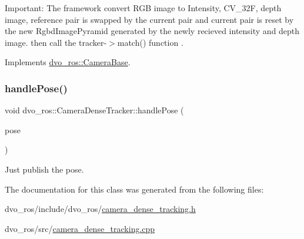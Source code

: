 Important\+: The framework convert R\+GB image to Intensity, C\+V\+\_\+32F, depth image, reference pair is swapped by the current pair and current pair is reset by the new Rgbd\+Image\+Pyramid generated by the newly recieved intensity and depth image. then call the tracker-\/$>$match() function . 

Implements \mbox{\hyperlink{classdvo__ros_1_1_camera_base_aa8c983ab1bb8383aae1f375ea6808120}{dvo\+\_\+ros\+::\+Camera\+Base}}.

\mbox{\label{classdvo__ros_1_1_camera_dense_tracker_a385c851351c4ab22240409d2d340344f}} 
\subsubsection{\texorpdfstring{handle\+Pose()}{handlePose()}}
{\footnotesize\ttfamily void dvo\+\_\+ros\+::\+Camera\+Dense\+Tracker\+::handle\+Pose (\begin{DoxyParamCaption}\item[{const geometry\+\_\+msgs\+::\+Pose\+With\+Covariance\+Stamped\+Const\+Ptr \&}]{pose }\end{DoxyParamCaption})}

Just publish the pose. 

The documentation for this class was generated from the following files\+:\begin{DoxyCompactItemize}
\item 
dvo\+\_\+ros/include/dvo\+\_\+ros/\mbox{\hyperlink{camera__dense__tracking_8h}{camera\+\_\+dense\+\_\+tracking.\+h}}\item 
dvo\+\_\+ros/src/\mbox{\hyperlink{camera__dense__tracking_8cpp}{camera\+\_\+dense\+\_\+tracking.\+cpp}}\end{DoxyCompactItemize}
